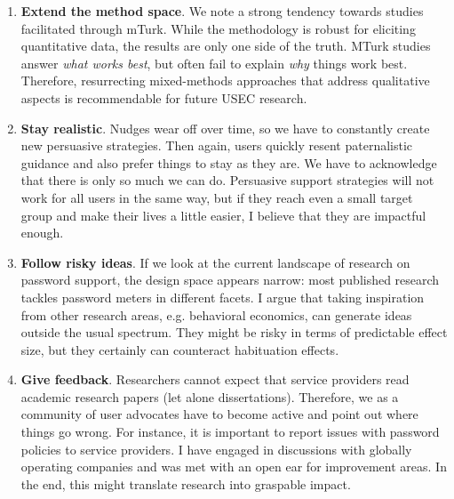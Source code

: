 \begin{enumerate}
	\item \textbf{Extend the method space}. \label{recommendation:method_space}We note a strong tendency towards studies facilitated through \gls{mTurk}. While the methodology is robust for eliciting quantitative data, the results are only one side of the truth. MTurk studies answer \textit{what works best}, but often fail to explain \textit{why} things work best. Therefore, resurrecting mixed-methods approaches that address qualitative aspects is recommendable for future USEC research. 
	
	\item \textbf{Stay realistic}. Nudges wear off over time, so we have to constantly create new persuasive strategies. Then again, users quickly resent paternalistic guidance and also prefer things to stay as they are. We have to acknowledge that there is only so much we can do. Persuasive support strategies will not work for all users in the same way, but if they reach even a small target group and make their lives a little easier, I believe that they are impactful enough. %
	
	\item \textbf{Follow risky ideas}. If we look at the current landscape of research on password support, the design space appears narrow: most published research tackles password meters in different facets. I argue that taking inspiration from other research areas, e.g. behavioral economics, can generate ideas outside the usual spectrum. They might be risky in terms of predictable effect size, but they certainly can counteract habituation effects. 
	
	
	\item \textbf{Give feedback}. Researchers cannot expect that service providers read academic research papers (let alone dissertations). Therefore, we as a community of user advocates have to become active and point out where things go wrong. For instance, it is important to report issues with password policies to service providers. I have engaged in discussions with globally operating companies and was met with an open ear for improvement areas. In the end, this might translate research into graspable impact. 
	
\end{enumerate}


